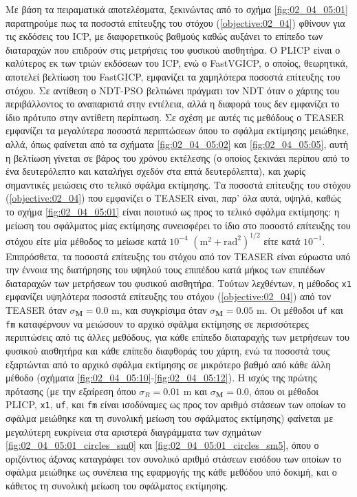 Με βάση τα πειραματικά αποτελέσματα, ξεκινώντας από το σχήμα
\ref{fig:02_04_05:01} παρατηρούμε πως τα ποσοστά επίτευξης του στόχου
(\ref{objective:02_04}) φθίνουν για τις εκδόσεις του ICP, με διαφορετικούς
βαθμούς καθώς αυξάνει το επίπεδο των διαταραχών που επιδρούν στις μετρήσεις του
φυσικού αισθητήρα. Ο PLICP είναι ο καλύτερος εκ των τριών εκδόσεων του ICP, ενώ
ο FastVGICP, ο οποίος, θεωρητικά, αποτελεί βελτίωση του FastGICP, εμφανίζει τα
χαμηλότερα ποσοστά επίτευξης του στόχου.  Σε αντίθεση ο NDT-PSO βελτιώνει
πράγματι τον NDT όταν ο χάρτης του περιβάλλοντος το αναπαριστά στην εντέλεια,
αλλά η διαφορά τους δεν εμφανίζει το ίδιο πρότυπο στην αντίθετη περίπτωση. Σε
σχέση με αυτές τις μεθόδους ο TEASER εμφανίζει τα μεγαλύτερα ποσοστά
περιπτώσεων όπου το σφάλμα εκτίμησης μειώθηκε, αλλά, όπως φαίνεται από τα
σχήματα \ref{fig:02_04_05:02} και \ref{fig:02_04_05:05}, αυτή η βελτίωση
γίνεται σε βάρος του χρόνου εκτέλεσης (ο οποίος ξεκινάει περίπου από το ένα
δευτερόλεπτο και καταλήγει σχεδόν στα επτά δευτερόλεπτα), και χωρίς σημαντικές
μειώσεις στο τελικό σφάλμα εκτίμησης. Τα ποσοστά επίτευξης του στόχου
(\ref{objective:02_04}) που εμφανίζει ο TEASER είναι, παρ' όλα αυτά, υψηλά,
καθώς το σχήμα \ref{fig:02_04_05:01} είναι ποιοτικό ως προς το τελικό σφάλμα
εκτίμησης: η μείωση του σφάλματος μίας εκτίμησης συνεισφέρει το ίδιο στο
ποσοστό επίτευξης του στόχου είτε μία μέθοδος το μείωσε κατά $10^{-4}$
$(\text{m}^2 + \text{rad}^2)^{1/2}$ είτε κατά $10^{-1}$. Επιπρόσθετα, τα
ποσοστά επίτευξης του στόχου από τον TEASER είναι εύρωστα υπό την έννοια της
διατήρησης του υψηλού τους επιπέδου κατά μήκος των επιπέδων διαταραχών των
μετρήσεων του φυσικού αισθητήρα. Τούτων λεχθέντων, η μέθοδος \texttt{x1}
εμφανίζει υψηλότερα ποσοστά επίτευξης του στόχου (\ref{objective:02_04}) από
τον TEASER όταν $\sigma_{\bm{M}} = 0.0$ m, και συγκρίσιμα όταν $\sigma_{\bm{M}}
= 0.05$ m. Οι μέθοδοι \texttt{uf} και \texttt{fm} καταφέρνουν να μειώσουν το
αρχικό σφάλμα εκτίμησης σε περισσότερες περιπτώσεις από τις άλλες μεθόδους, για
κάθε επίπεδο διαταραχής των μετρήσεων του φυσικού αισθητήρα και κάθε επίπεδο
διαφθοράς του χάρτη, ενώ τα ποσοστά τους εξαρτώνται από το αρχικό σφάλμα
εκτίμησης σε μικρότερο βαθμό από κάθε άλλη μέθοδο (σχήματα
\ref{fig:02_04_05:10}-\ref{fig:02_04_05:12}). Η ισχύς της πρώτης πρότασης (με
την εξαίρεση όπου $\sigma_R = 0.01$ m και $\sigma_{\bm{M}} = 0.0$, όπου οι
μέθοδοι PLICP, \texttt{x1}, \texttt{uf}, και \texttt{fm} είναι ισοδύναμες ως
προς τον αριθμό στάσεων των οποίων το σφάλμα μειώθηκε και τη συνολική μείωση
του σφάλματος εκτίμησης) φαίνεται με μεγαλύτερη ευκρίνεια στα αριστερά
διαγράμματα των σχημάτων \ref{fig:02_04_05:01_circles_sm0} και
\ref{fig:02_04_05:01_circles_sm5}, όπου ο οριζόντιος άξονας καταγράφει τον
συνολικό αριθμό στάσεων εισόδου των οποίων το σφάλμα μειώθηκε ως συνέπεια της
εφαρμογής της κάθε μεθόδου υπό δοκιμή, και ο κάθετος τη συνολική μείωση του
σφάλματος εκτίμησης.

